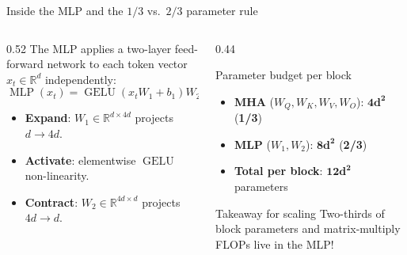 \documentclass[handout]{beamer}
\begin{document}
\begin{frame}{Inside the MLP and the $1/3$ vs.\ $2/3$ parameter rule}
  \begin{columns}[c]
    \begin{column}{0.52\linewidth}
      \small The MLP applies a two-layer feed-forward network to each token vector $x_t \in \mathbb{R}^d$ independently:
      \[
        \operatorname{MLP}(x_t) = \operatorname{GELU}(x_t W_1 + b_1) W_2 + b_2
      \]
      \begin{itemize}
          \setlength{\itemsep}{4pt}
          \footnotesize
        \item \textbf{Expand}: $W_1 \in \mathbb{R}^{d \times 4d}$ projects $d \to 4d$.
        \item \textbf{Activate}: elementwise $\operatorname{GELU}$ non-linearity.
        \item \textbf{Contract}: $W_2 \in \mathbb{R}^{4d \times d}$ projects $4d \to d$.
      \end{itemize}
    \end{column}
    \begin{column}{0.44\linewidth}
      \begin{block}{Parameter budget per block}
        \footnotesize
        \begin{itemize}
            \setlength{\itemsep}{2pt}
          \item \textbf{MHA} ($W_Q, W_K, W_V, W_O$): $\mathbf{4d^2}$ (\textbf{1/3})
          \item \textbf{MLP} ($W_1, W_2$): $\mathbf{8d^2}$ (\textbf{2/3})
          \item \textbf{Total per block}: $\mathbf{12d^2}$ parameters
        \end{itemize}
      \end{block}
      \begin{alertblock}{Takeaway for scaling}
        \footnotesize Two-thirds of block parameters and matrix-multiply FLOPs live in the MLP!
      \end{alertblock}
    \end{column}
  \end{columns}
\end{frame}
\end{document}
